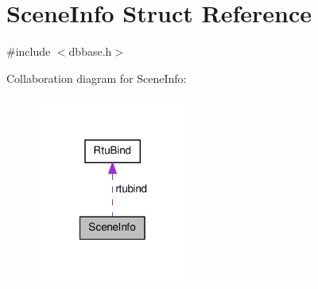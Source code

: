 \hypertarget{structSceneInfo}{\section{Scene\-Info Struct Reference}
\label{structSceneInfo}
}


{\ttfamily \#include $<$dbbase.\-h$>$}



Collaboration diagram for Scene\-Info\-:\nopagebreak
\begin{figure}[H]
\begin{center}
\leavevmode
\includegraphics[width=143pt]{structSceneInfo__coll__graph}
\end{center}
\end{figure}
